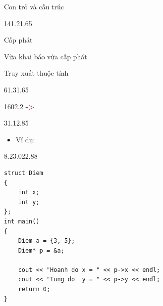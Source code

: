 \begin{frame}{Con trỏ và cấu trúc}
\begin{blk}{14}{1.2}{1.65}
\par
{}\par\vspace{0.85cm}
Cấp phát\par\vspace{2pt}
\par\vspace{0.75cm}
Vừa khai báo vừa cấp phát\par\vspace{2pt}
\end{blk}
\end{frame}

\begin{frame}[fragile]{Truy xuất thuộc tính}
\begin{blk}{6}{1.3}{1.65}\end{blk}
\begin{blk}{16}{0}{2.2}\centering\fontsize{12}{14}\selectfont\ttfamily
{}\textcolor{red}{\textbf{->}}
\end{blk}
\begin{blk}{3}{1.1}{2.85}\begin{itemize}\small\item Ví dụ:\end{itemize}\end{blk}
\begin{blk}{8.2}{3.02}{2.88}
\begin{lstlisting}[basicstyle=\cf{9}]
struct Diem
{
    int x;
    int y;
};
int main()
{
    Diem a = {3, 5};
    Diem* p = &a;

    cout << "Hoanh do x = " << p->x << endl;
    cout << "Tung do  y = " << p->y << endl;
    return 0;
}
\end{lstlisting}
\end{blk}
\end{frame}

